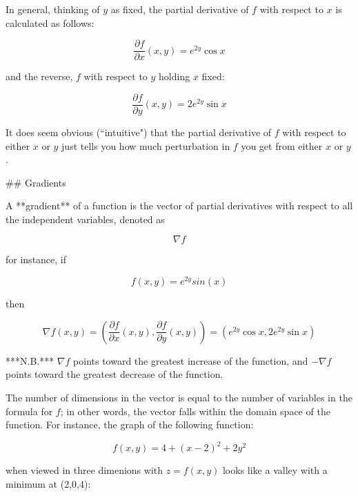 \begin{markdown}
In general, thinking of $y$ as fixed, the partial derivative of $f$ with respect
to $x$ is calculated as follows:

\begin{equation}
    \frac{\partial f}{\partial x}(x,y) = e^{2y}\cos{x}
\end{equation}

and the reverse, $f$ with respect to $y$ holding $x$ fixed:

\begin{equation}
    \frac{\partial f}{\partial y}(x,y) = 2e^{2y}\sin{x}
\end{equation}

It does seem obvious (``intuitive") that the partial derivative of $f$ with
respect to either $x$ or $y$ just tells you how much perturbation in $f$ you get
from either $x$ or $y$.

## Gradients

A **gradient** of a function is the vector of partial derivatives with respect
to all the independent variables, denoted as

\begin{equation}
    \nabla f
\end{equation}

for instance, if

\begin{equation}
    f(x,y) = e^{2y}sin(x)
\end{equation}

then

\begin{equation}
    \nabla f(x,y) =
    \left( \frac{\partial f}{\partial x}(x,y), \frac{\partial f}{\partial y}(x,y) \right) =
    (e^{2y}\cos{x}, 2e^{2y}\sin{x})
\end{equation}

***N.B.*** $\nabla f$ points toward the greatest increase of the function, and
$-\nabla f$ points toward the greatest decrease of the function.

The number of dimensions in the vector is equal to the number of variables in
the formula for $f$; in other words, the vector falls within the domain space of
the function. For instance, the graph of the following function:

\begin{equation}
    f(x,y) = 4 + (x - 2)^2 + 2y^2
\end{equation}

when viewed in three dimenions with $z = f(x,y)$ looks like a valley with a
minimum at (2,0,4):


\end{markdown}
